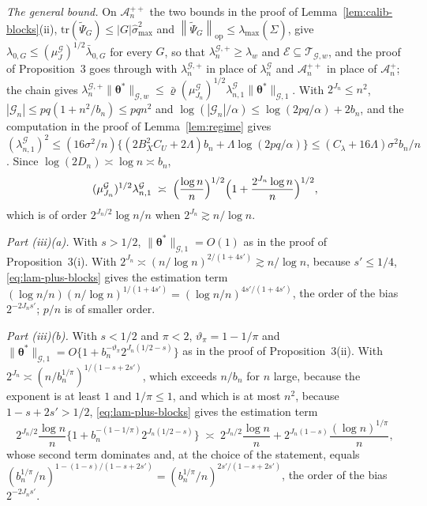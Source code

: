 \documentclass[10pt]{book}
\theoremstyle{definition}
\newcommand{\btheta}{\boldsymbol{\theta}}
\newcommand{\thetastar}{\btheta^{*}}
\newcommand{\Gramhat}{\widehat{\Sigma}}
\newcommand{\pen}{\lambda}
\newcommand{\seff}{s'}
\newcommand{\smax}{\widehat{\sigma}_{\max}}
\newcommand{\lmaxx}{\lambda_{\max}}
\newcommand{\opnorm}[1]{\left\lVert #1 \right\rVert_{\mathrm{op}}}
\newcommand{\Gcal}{\mathcal{G}}
\newcommand{\bn}{b_{n}}
\newcommand{\nGw}[1]{\lVert #1\rVert_{\mathcal{G},w}}
\newcommand{\nGone}[1]{\lVert #1\rVert_{\mathcal{G},1}}
\newcommand{\Psitil}{\widetilde{\Psi}}
\newcommand{\lamG}{\lambda^{\mathcal{G}}_{n}}
\newcommand{\lamGone}{\lambda^{\mathcal{G}}_{n,1}}
\newcommand{\lamGp}{\lambda^{\mathcal{G},+}_{n}}   %
\newcommand{\lamz}[1]{\lambda_{0,#1}}
\newcommand{\lamzbar}[1]{\bar{\lambda}_{0,#1}}
\newcommand{\Tw}{\mathcal{T}_{\mathcal{G},w}}
\newcommand{\Ecal}{\mathcal{E}}
\newcommand{\Acal}{\mathcal{A}_{n}}
\begin{document}
{\emph{The general bound.} On $\Acal^{++}$ the two bounds in the proof of
Lemma~\ref{lem:calib-blocks}(ii), $\mathrm{tr}(\Psitil_{G}) \le |G|\smax^{2}$
and $\opnorm{\Psitil_{G}} \le \lmaxx(\Gramhat)$, give
$\lamz{G} \le (\mu^{\Gcal}_{J})^{1/2}\lamzbar{G}$ for every $G$, so that
$\lamGp \ge \pen_{w}$ and $\Ecal \subseteq \Tw$, and the proof of
Proposition~3 goes through with $\lamGp$ in place of $\lamG$ and $\Acal^{++}$
in place of $\Acal^{+}$; the chain gives
$\lamGp\nGw{\thetastar} \le \bar\varrho(\mu^{\Gcal}_{J_n})^{1/2}
\lamGone\nGone{\thetastar}$. With $2^{J_n} \le n^{2}$,
$|\Gcal_{n}| \le pq(1 + n^{2}/\bn) \le pqn^{2}$ and
$\log(|\Gcal_{n}|/\alpha) \le \log(2pq/\alpha) + 2\bn$, and the computation in
the proof of Lemma~\ref{lem:regime} gives
$(\lamGone)^{2} \le (16\sigma^{2}/n)\{(2B_X^{2}C_U + 2\Lambda)\bn +
\Lambda\log(2pq/\alpha)\} \le (C_{\pen} + 16\Lambda)\sigma^{2}\bn/n$. Since
$\log(2D_n) \asymp \log n \asymp \bn$,
\begin{equation}
  \label{eq:lam-plus-blocks}
  (\mu^{\Gcal}_{J_n})^{1/2}\lamGone \;\asymp\;
  \Bigl(\frac{\log n}{n}\Bigr)^{1/2}
  \Bigl(1 + \frac{2^{J_n}\log n}{n}\Bigr)^{1/2},
\end{equation}
which is of order $2^{J_n/2}\log n/n$ when $2^{J_n} \gtrsim n/\log n$.

\emph{Part (iii)(a).} With $s > 1/2$, $\nGone{\thetastar} = O(1)$ as in the
proof of Proposition~3(i). With
$2^{J_n} \asymp (n/\log n)^{2/(1+4\seff)} \gtrsim n/\log n$, because
$\seff \le 1/4$, \eqref{eq:lam-plus-blocks} gives the estimation term
$(\log n/n)(n/\log n)^{1/(1+4\seff)} = (\log n/n)^{4\seff/(1+4\seff)}$, the
order of the bias $2^{-2J_n\seff}$; $p/n$ is of smaller order.

\emph{Part (iii)(b).} With $s < 1/2$ and $\pi < 2$,
$\vartheta_{\pi} = 1 - 1/\pi$ and
$\nGone{\thetastar} = O\{1 + \bn^{-\vartheta_{\pi}}2^{J_n(1/2-s)}\}$ as in the
proof of Proposition~3(ii). With
$2^{J_n} \asymp (n/\bn^{1/\pi})^{1/(1-s+2\seff)}$, which exceeds $n/\bn$ for
$n$ large, because the exponent is at least $1$ and $1/\pi \le 1$, and which is
at most $n^{2}$, because $1-s+2\seff > 1/2$, \eqref{eq:lam-plus-blocks} gives
the estimation term
\[
  2^{J_n/2}\frac{\log n}{n}\bigl\{1 + \bn^{-(1-1/\pi)}2^{J_n(1/2-s)}\bigr\}
  \;\asymp\; 2^{J_n/2}\frac{\log n}{n} +
  2^{J_n(1-s)}\frac{(\log n)^{1/\pi}}{n},
\]
whose second term dominates and, at the choice of the statement, equals
$(\bn^{1/\pi}/n)^{1-(1-s)/(1-s+2\seff)} =
(\bn^{1/\pi}/n)^{2\seff/(1-s+2\seff)}$, the order of the bias
$2^{-2J_n\seff}$.

}
\end{document}
